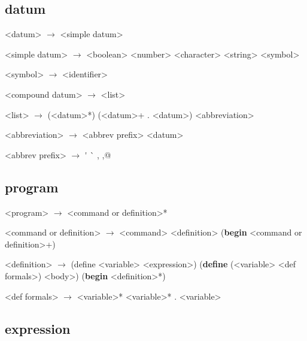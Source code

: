 \documentclass[11pt]{report}
\begin{document}
\setlength{\grammarindent}{3em}
\subsection{datum}

\begin{grammar}
  <datum> $\longrightarrow$ <simple datum> 

  <simple datum> $\longrightarrow$ <boolean> \alt <number>
  \alt <character> \alt <string> \alt <symbol>

  <symbol> $\longrightarrow$ <identifier>

  <compound datum> $\longrightarrow$ <list>

  <list> $\longrightarrow$ (<datum>*) \alt (<datum>+  .  <datum>)
  \alt <abbreviation>

  <abbreviation> $\longrightarrow$ <abbrev prefix> <datum>

  <abbrev prefix> $\longrightarrow$ \'{} \alt \`{} \alt , \alt ,@
  
\end{grammar}

\subsection{program}

\begin{grammar}
  <program> $\longrightarrow$ <command or definition>*
  
  <command or definition> $\longrightarrow$ <command>
  \alt <definition>
  \alt (\textbf{begin} <command or definition>+)

  <definition> $\longrightarrow$ (define <variable> <expression>)
  \alt (\textbf{define} (<variable> <def formals>) <body>)
  \alt (\textbf{begin} <definition>*)

  <def formals> $\longrightarrow$ <variable>*
  \alt <variable>*  .  <variable>
\end{grammar}

\subsection{expression}
\end{document}
